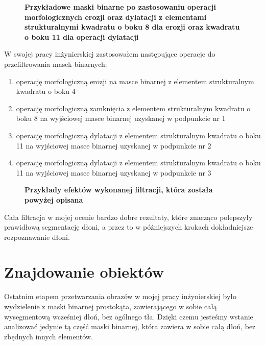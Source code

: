 \documentclass[a4paper,12pt,twoside,openany]{report}
\newcommand{\ImgPath}{.}
\begin{document}
\begin{figure}[H]
	\centering
	\caption{  \textbf{Przykładowe maski binarne po zastosowaniu operacji morfologicznych erozji oraz dylatacji z elementami strukturalnymi kwadratu o boku 8 dla erozji oraz kwadratu o boku 11 dla operacji dylatacji}}
\end{figure}

W swojej pracy inżynierskiej zastosowałem następujące operacje do przefiltrowania masek binarnych: 
\begin{enumerate}
	\item operację morfologiczną erozji na masce binarnej z elementem strukturalnym kwadratu o boku 4
	\item operację morfologiczną zamknięcia z elementem strukturalnym kwadratu o boku 8 na wyjściowej masce binarnej uzyskanej w podpunkcie nr 1
	\item operację morfologiczną dylatacji z elementem strukturalnym kwadratu o boku 11 na wyjściowej masce binarnej uzyskanej w podpunkcie nr 2
	\item operację morfologiczną dylatacji z elementem strukturalnym kwadratu o boku 11 na wyjściowej masce binarnej uzyskanej w podpunkcie nr 3
\end{enumerate}

\begin{figure}[H]
	\centering
	\caption{  \textbf{Przykłady efektów wykonanej filtracji, która została powyżej opisana}}
\end{figure}

Cała filtracja  w mojej ocenie bardzo dobre rezultaty, które znacząco polepszyły prawidłową segmentację dłoni, a przez to w późniejszych krokach dokładniejsze rozpoznawanie dłoni.

\section{Znajdowanie obiektów}
Ostatnim etapem przetwarzania obrazów w mojej pracy inżynierskiej było wydzielenie z maski binarnej prostokąta, zawierającego w sobie całą wysegmentową wcześniej dłoń, bez ogólnego tła. Dzięki czemu jesteśmy wstanie analizować jedynie tą część maski binarnej, która zawiera w sobie całą dłoń, bez zbędnych innych elementów.
\end{document}
